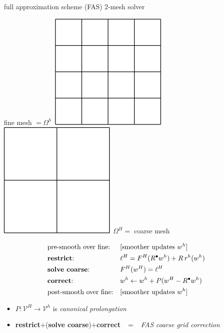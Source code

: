 \documentclass[svgnames,
               hyperref={colorlinks,citecolor=DeepPink4,linkcolor=FireBrick,urlcolor=Maroon},
               usepdftitle=false]  %
               {beamer}
\newcommand{\iR}{R^{\bullet}}
\begin{document}
\begin{frame}{full approximation scheme (FAS) 2-mesh solver}

\begin{center}
fine mesh $=\Omega^h$\, \includegraphics[height=0.14\textheight]{../talk-oxford/images/fine-grid.png} \hspace{15mm} \includegraphics[height=0.14\textheight]{../talk-oxford/images/coarse-grid.png} \,$\Omega^H=$ coarse mesh
\end{center}

\begin{align*}
&\text{pre-smooth over fine:} & & [\text{smoother updates } w^h] \\
&\text{\textbf{restrict}:}                   & &\ell^H = F^H(\iR w^h) + R\, r^h(w^h) \\
&\text{\textbf{solve coarse}:}                      & &F^H(w^H) = \ell^H \\
&\text{\textbf{correct}:}                    & &w^h \leftarrow w^h + P(w^H - \iR w^h) \\
&\text{post-smooth over fine:} & & [\text{smoother updates } w^h]
\end{align*}

\bigskip
{\small
\begin{itemize}
\item $P: \mathcal{V}^H \to \mathcal{V}^h$ is \emph{canonical prolongation}
\item \textbf{restrict}$+$(\textbf{solve coarse})$+$\textbf{correct} \, $=$ \, \emph{FAS coarse grid correction}
\end{itemize}
}
\end{frame}
\end{document}
